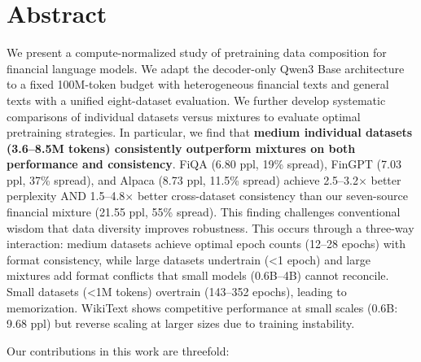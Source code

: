 \documentclass[11pt,a4paper,english,oneside]{book}
\begin{document}
\thispagestyle{empty}
\titleGP

\newpage

\setcounter{page}{1}

\section*{Abstract}
\thispagestyle{firststyle}

We present a compute-normalized study of pretraining data composition for financial language models. We adapt the decoder-only Qwen3 Base architecture to a fixed 100M-token budget with heterogeneous financial texts and general texts with a unified eight-dataset evaluation. We further develop systematic comparisons of individual datasets versus mixtures to evaluate optimal pretraining strategies. In particular, we find that \textbf{medium individual datasets (3.6–8.5M tokens) consistently outperform mixtures on both performance and consistency}. FiQA (6.80 ppl, 19\% spread), FinGPT (7.03 ppl, 37\% spread), and Alpaca (8.73 ppl, 11.5\% spread) achieve 2.5–3.2$\times$ better perplexity AND 1.5–4.8$\times$ better cross-dataset consistency than our seven-source financial mixture (21.55 ppl, 55\% spread). This finding challenges conventional wisdom that data diversity improves robustness. This occurs through a three-way interaction: medium datasets achieve optimal epoch counts (12–28 epochs) with format consistency, while large datasets undertrain (<1 epoch) and large mixtures add format conflicts that small models (0.6B–4B) cannot reconcile. Small datasets (<1M tokens) overtrain (143–352 epochs), leading to memorization. WikiText shows competitive performance at small scales (0.6B: 9.68 ppl) but reverse scaling at larger sizes due to training instability.

Our contributions in this work are threefold:
\end{document}
